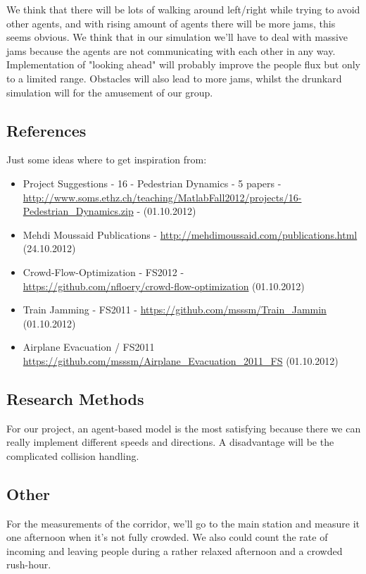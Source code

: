We think that there will be lots of walking around left/right while trying to avoid other agents, and with rising amount of agents there will be more jams, this seems obvious. We think that in our simulation we'll have to deal with massive jams because the agents are not communicating with each other in any way. Implementation of "looking ahead" will probably improve the people flux but only to a limited range. Obstacles will also lead to more jams, whilst the drunkard simulation will for the amusement of our group.

\subsection*{References}

Just some ideas where to get inspiration from:
\begin{itemize}
 \item Project Suggestions - 16 - Pedestrian Dynamics - 5 papers - \\ \url{http://www.soms.ethz.ch/teaching/MatlabFall2012/projects/16-Pedestrian_Dynamics.zip} - (01.10.2012)
 \item Mehdi Moussaid Publications - \url{http://mehdimoussaid.com/publications.html} (24.10.2012)
 \item Crowd-Flow-Optimization - FS2012 - \\ \url{https://github.com/nfloery/crowd-flow-optimization} (01.10.2012)
 \item Train Jamming - FS2011 - \url{https://github.com/msssm/Train_Jammin} (01.10.2012)
 \item Airplane Evacuation / FS2011 \url{https://github.com/msssm/Airplane_Evacuation_2011_FS} (01.10.2012)
\end{itemize}
 
\subsection*{Research Methods}

For our project, an agent-based model is the most satisfying because there we can really implement different speeds and directions. A disadvantage will be the complicated collision handling.

\subsection*{Other}

For the measurements of the corridor, we'll go to the main station and measure it one afternoon when it's not fully crowded. We also could count the rate of incoming and leaving people during a rather relaxed afternoon and a crowded rush-hour.